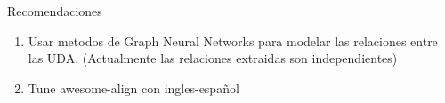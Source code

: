 \begin{recomendations}
    Recomendaciones

    \begin{enumerate}
        \item Usar metodos de Graph Neural Networks para modelar las relaciones entre las UDA. (Actualmente las relaciones extraidas son independientes)
        \item Tune awesome-align con ingles-español
    \end{enumerate}
\end{recomendations}
